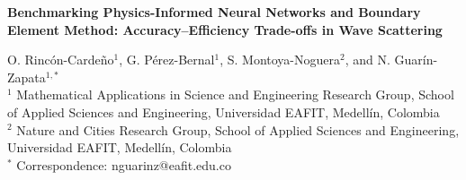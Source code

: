 \documentclass[11pt,twoside]{article}
\begin{document}
\thispagestyle{empty}  



\vspace{-2mm} 
\begin{minipage}{15.0cm}
    \begin{center}
        \textbf{\large Benchmarking Physics-Informed Neural Networks and Boundary Element Method: Accuracy\allowbreak--\allowbreak Efficiency Trade-offs in Wave Scattering}  
    \end{center}                 
\end{minipage}
\begin{minipage}{0.0cm}
    \begin{center}
    \end{center}
\end{minipage}    
 
\vspace{-2mm} 

\vspace{0.6cm}
 
{\footnotesize\noindent O. Rincón-Cardeño$^1$, G. Pérez-Bernal$^1$, S. Montoya-Noguera$^2$, and N. Guarín-Zapata$^{1,*}$ \\
$^1$ Mathematical Applications in Science and Engineering Research Group, School of Applied Sciences and Engineering, Universidad EAFIT, 
  Medellín, Colombia \\
$^2$ Nature and Cities Research Group, School of Applied Sciences and Engineering, Universidad EAFIT, Medellín, Colombia\\
  $^*$ Correspondence: nguarinz@eafit.edu.co\\}
\end{document}
